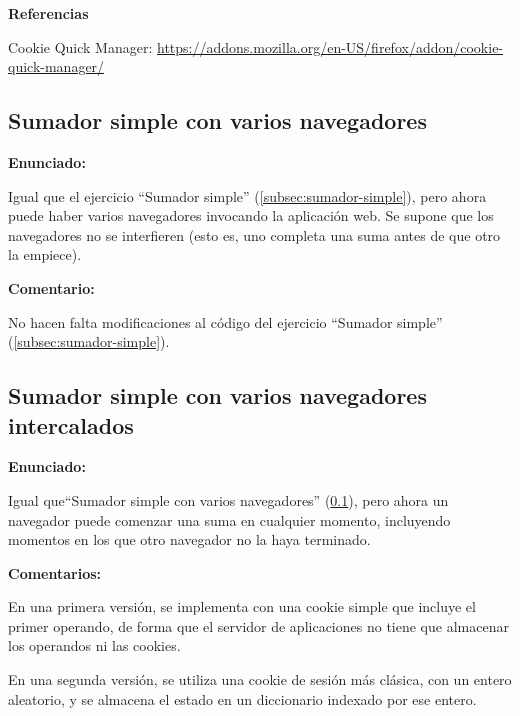 \textbf{Referencias}

Cookie Quick Manager: \url{https://addons.mozilla.org/en-US/firefox/addon/cookie-quick-manager/}


\subsection{Sumador simple con varios navegadores}
\label{subsec:sumador-simple-varios}

\textbf{Enunciado:}

Igual que el ejercicio ``Sumador simple'' (\ref{subsec:sumador-simple}), pero ahora puede haber varios navegadores invocando la aplicación web. Se supone que los navegadores no se interfieren (esto es, uno completa una suma antes de que otro la empiece).

\textbf{Comentario:}

No hacen falta modificaciones al código del ejercicio ``Sumador simple'' (\ref{subsec:sumador-simple}).


\subsection{Sumador simple con varios navegadores intercalados}
\label{subsec:sumador-simple-varios-intercalados}

\textbf{Enunciado:}

Igual que``Sumador simple con varios navegadores'' (\ref{subsec:sumador-simple-varios}), pero ahora un navegador puede comenzar una suma en cualquier momento, incluyendo momentos en los que otro navegador no la haya terminado.

\textbf{Comentarios:}

En una primera versión, se implementa con una cookie simple que incluye el primer operando, de forma que el servidor de aplicaciones no tiene que almacenar los operandos ni las cookies.

En una segunda versión, se utiliza una cookie de sesión más clásica, con un entero aleatorio, y se almacena el estado en un diccionario indexado por ese entero.

